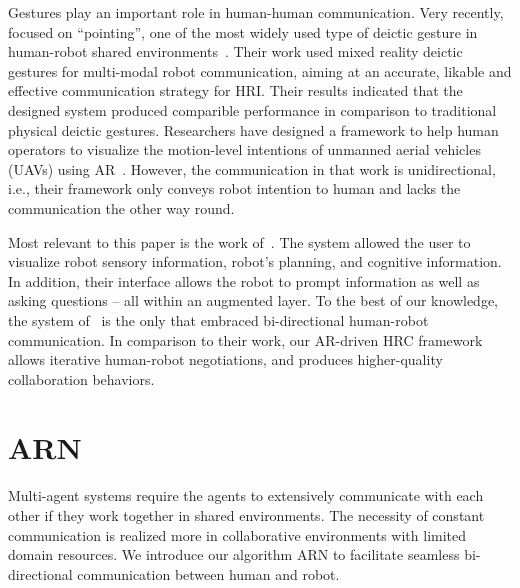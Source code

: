 \documentclass{article}
\begin{document}
Gestures play an important role in human-human communication. 
Very recently, \citeauthor{williams2019hri} focused on ``pointing'', one of the most widely used type of deictic gesture in human-robot shared environments~\cite{williams2019hri}.
Their work used mixed reality deictic gestures for multi-modal robot communication, aiming at an accurate, likable and effective communication strategy for HRI. 
Their results indicated that the designed system produced comparible performance in comparison to traditional physical deictic gestures. 
Researchers have designed a framework to help human operators to visualize the motion-level intentions of unmanned aerial vehicles (UAVs) using AR~\cite{walker2018communicating}. 
However, the communication in that work is unidirectional, i.e., their framework only conveys robot intention to human and lacks the communication the other way round. 

Most relevant to this paper is the work of~\cite{muhammad2019creating}. 
The system allowed the user to visualize robot sensory information, robot's planning, and cognitive information. 
In addition, their interface allows the robot to prompt information as well as asking questions -- all within an augmented layer. 
To the best of our knowledge, the system of~\citeauthor{muhammad2019creating} is the only that embraced bi-directional human-robot communication. 
In comparison to their work, our AR-driven HRC framework allows iterative human-robot negotiations, and produces higher-quality collaboration behaviors. 



\section{ARN}

Multi-agent systems require the agents to extensively communicate with each other if they work together in shared environments. The necessity of constant communication is realized more in collaborative environments with limited domain resources. We introduce our algorithm ARN to facilitate seamless bi-directional communication between human and robot.
\end{document}

